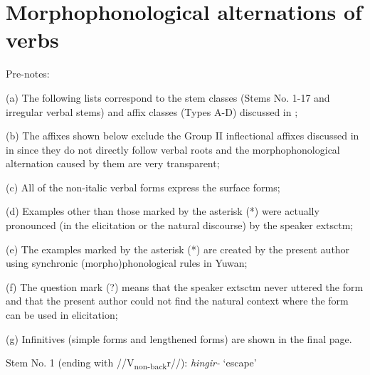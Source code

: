 \chapter{Morphophonological alternations of verbs}
\hypertarget{RefHeadingToc395697264}{}

Pre-notes:

(a)  The following lists correspond to the stem classes (Stems No. 1-17 and irregular verbal stems) and affix classes (Types A-D) discussed in ;

(b)  The affixes shown below exclude the Group II inflectional affixes discussed in  in  since they do not directly follow verbal roots and the morphophonological alternation caused by them are very transparent;

(c)  All of the non-italic verbal forms express the surface forms;

(d)  Examples other than those marked by the asterisk (*) were actually pronounced (in the elicitation or the natural discourse) by the speaker 	extsc{tm};

(e)  The examples marked by the asterisk (*) are created by the present author using synchronic (morpho)phonological rules in Yuwan;

(f)  The question mark (?) means that the speaker 	extsc{tm} never uttered the form and that the present author could not find the natural context where the form can be used in elicitation;

(g)  Infinitives (simple forms and lengthened forms) are shown in the final page.

Stem No. 1 (ending with //V\textsubscript{non-back}r//): \textit{hingir-} ‘escape’

\tablefirsthead{}

